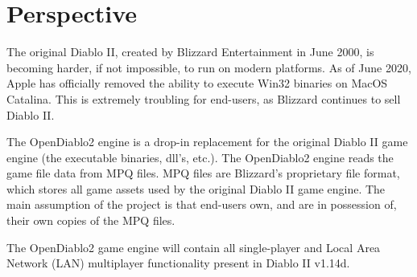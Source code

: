 \section{Perspective} \label{sec:productperspective}


The original Diablo II, created by Blizzard Entertainment in June 2000, is
becoming harder, if not impossible, to run on modern platforms. As of June 2020,
Apple has officially removed the ability to execute Win32 binaries on MacOS
Catalina. This is extremely troubling for end-users, as Blizzard continues to
sell Diablo II.

The OpenDiablo2 engine is a drop-in replacement for the original Diablo II game
engine (the executable binaries, dll's, etc.). The OpenDiablo2 engine reads the
game file data from MPQ files. MPQ files are Blizzard's proprietary file format,
which stores all game assets used by the original Diablo II game engine. The
main assumption of the project is that end-users own, and are in possession of,
their own copies of the MPQ files.

The OpenDiablo2 game engine will contain all single-player and Local Area Network 
(LAN) multiplayer functionality present in Diablo II v1.14d.
